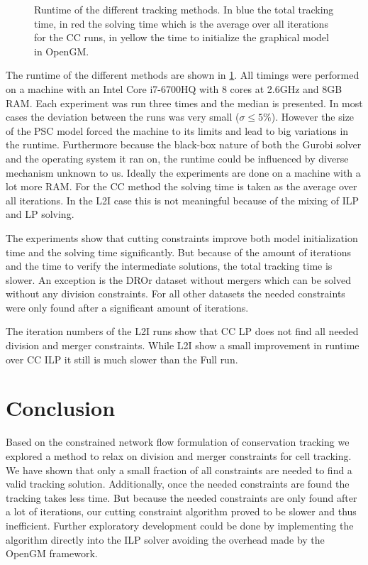 \documentclass[10pt,twocolumn,letterpaper]{article}
\begin{document}
\begin{figure}[t]
\begin{center}
  \end{center}
   \caption{Runtime of the different tracking methods. In blue the total tracking time, in red the solving time which is the average over all iterations for the CC runs, in yellow the time to initialize the graphical model in OpenGM.}
  \label{fig:runtime}
\end{figure}

    The runtime of the different methods are shown in \cref{fig:runtime}. All timings were performed on a machine with an Intel Core i7-6700HQ with 8 cores at 2.6GHz and 8GB RAM. Each experiment was run three times and the median is presented. In most cases the deviation between the runs was very small ($\sigma \leq 5\%$). However the size of the PSC model forced the machine to its limits and lead to big variations in the runtime. Furthermore because the black-box nature of both the Gurobi solver and the operating system it ran on, the runtime could be influenced by diverse mechanism unknown to us. Ideally the experiments are done on a machine with a lot more RAM. For the CC method the solving time is taken as the average over all iterations. In the L2I case this is not meaningful because of the mixing of ILP and LP solving.

The experiments show that cutting constraints improve both model initialization time and the solving time significantly. But because of the amount of iterations and the time to verify the intermediate solutions, the total tracking time is slower. An exception is the DROr dataset without mergers which can be solved without any division constraints. For all other datasets the needed constraints were only found after a significant amount of iterations.

The iteration numbers of the L2I runs show that CC LP does not find all needed division and merger constraints. While L2I show a small improvement in runtime over CC ILP it still is much slower than the Full run.

\section{Conclusion}

Based on the constrained network flow formulation of conservation tracking we explored a method to relax on division and merger constraints for cell tracking. We have shown that only a small fraction of all constraints are needed to find a valid tracking solution. Additionally, once the needed constraints are found the tracking takes less time. But because the needed constraints are only found after a lot of iterations, our cutting constraint algorithm proved to be slower and thus inefficient. Further exploratory development could be done by implementing the algorithm directly into the ILP solver avoiding the overhead made by the OpenGM framework.


{\small


}
\end{document}
